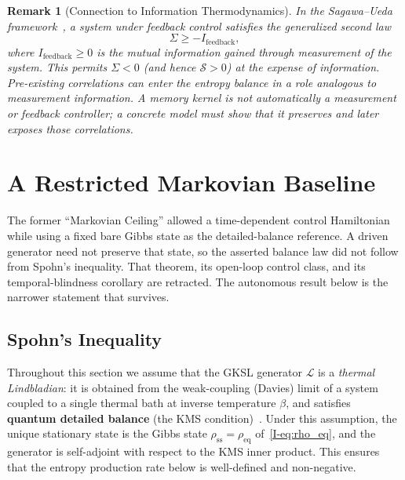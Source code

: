 \documentclass[12pt,a4paper,openany]{book}
\newtheorem{remark}[theorem]{Remark}
\begin{document}
\begin{remark}[Connection to Information Thermodynamics]
\label{I-rem:connection_SU}
In the Sagawa--Ueda framework~\cite{SagawaUeda2010,SagawaUeda2012},
a system under feedback control satisfies the generalized second law
\begin{equation}
\label{I-eq:sagawa_ueda}
\Sigma \geq -I_{\mathrm{feedback}},
\end{equation}
where $I_{\mathrm{feedback}} \geq 0$ is the mutual information
gained through measurement of the system.
This permits $\Sigma < 0$ (and hence $\mathcal{S} > 0$) at
the expense of information.
Pre-existing correlations can enter the entropy balance in a role
analogous to measurement information.  A memory kernel is not
automatically a measurement or feedback controller; a concrete model
must show that it preserves and later exposes those correlations.
\end{remark}

\section{A Restricted Markovian Baseline}
\label{I-sec:ceiling}

The former ``Markovian Ceiling'' allowed a time-dependent control
Hamiltonian while using a fixed bare Gibbs state as the
detailed-balance reference.  A driven generator need not preserve that
state, so the asserted balance law did not follow from Spohn's
inequality.  That theorem, its open-loop control class, and its
temporal-blindness corollary are retracted.  The autonomous result below
is the narrower statement that survives.

\subsection{Spohn's Inequality}

Throughout this section we assume that the GKSL generator
$\mathcal{L}$ is a \emph{thermal Lindbladian}: it is obtained
from the weak-coupling (Davies) limit of a system coupled to a
single thermal bath at inverse temperature $\beta$, and satisfies
\textbf{quantum detailed balance} (the KMS
condition)~\cite{Spohn1978,BreuerPetruccione2002}.
Under this assumption, the unique stationary state is the Gibbs
state $\rho_{\mathrm{ss}} = \rho_{\mathrm{eq}}$
of~\eqref{I-eq:rho_eq}, and the generator is self-adjoint with
respect to the KMS inner product.
This ensures that the entropy production rate below is
well-defined and non-negative.
\end{document}

